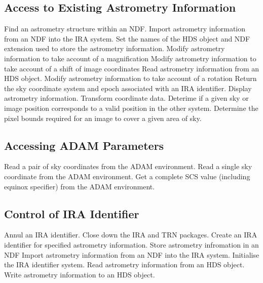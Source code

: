 \subsection {Access to Existing Astrometry Information}
   {Find an astrometry structure within an NDF.}
   {Import astrometry information from an NDF into the IRA system.}
   {Set the names of the HDS object and NDF extension used to store the
   astrometry information.}
   {Modify astrometry information to take account of a magnification}
   {Modify astrometry information to take account of a shift of image
coordinates}
   {Read astrometry information from an HDS object.}
   {Modify astrometry information to take account of a rotation}
   {Return the sky coordinate system and epoch associated with an IRA
    identifier.}
   {Display astrometry information.}
   {Transform coordinate data.}
   {Deterime if a given sky or image position corresponds to a valid position
    in the other system.}
   {Determine the pixel bounds required for an image to cover a given area of
    sky.}

\subsection {Accessing ADAM Parameters}
\label {APP:ADAM}
   {Read a pair of sky coordinates from the ADAM environment.}
   {Read a single sky coordinate from the ADAM environment.}
   {Get a complete SCS value (including equinox specifier) from the ADAM
    environment.}

\subsection {Control of IRA Identifier}
   {Annul an IRA identifier.}
   {Close down the IRA and TRN packages.}
   {Create an IRA identifier for specified astrometry information.}
   {Store astrometry infromation in an NDF}
   {Import astrometry information from an NDF into the IRA system.}
   {Initialise the IRA identifier system.}
   {Read astrometry information from an HDS object.}
   {Write astrometry information to an HDS object.}

